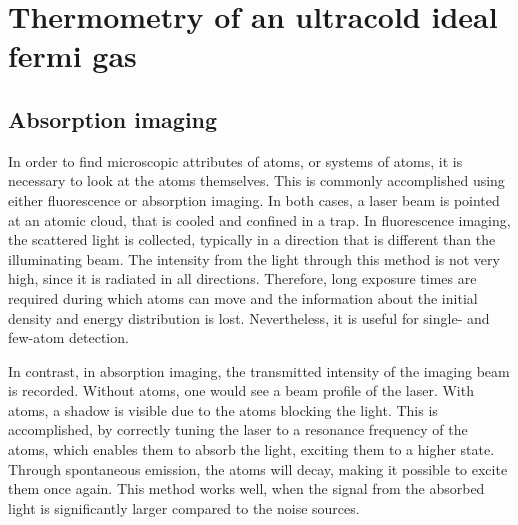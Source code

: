 \chapter{Thermometry of an ultracold ideal fermi gas}
\iffalse
The purpose of the camera is to measure scientifically important data from dense atomic clouds consisting of Lithium and Caesium.
The improvement of the resolution in the whole imaging setup now allows to find new attributes that could not be measured before and as an example, fermionic superfluids were chosen. The key signature of a superfluid transition can be found by creating a population imbalance, that then shows a unique structure in the centre of the cloud, differing them from the Thomas-Fermi distribution that is apparent in Bose-Einstein condensates (BEC).
\fi

\section{Absorption imaging}
In order to find microscopic attributes of atoms, or systems of atoms, it is necessary to look at the atoms themselves. This is commonly accomplished using either fluorescence or absorption imaging. In both cases, a laser beam is pointed at an atomic cloud, that is cooled and confined in a trap. In fluorescence imaging, the scattered light is collected, typically in a direction that is different than the illuminating beam.
The intensity from the light through this method is not very high, since it is radiated in all directions. Therefore, long exposure times are required during which atoms can move and the information about the initial density and energy distribution is lost. Nevertheless, it is useful for single- and few-atom detection. 

In contrast, in absorption imaging, the transmitted intensity of the imaging beam is recorded. Without atoms, one would see a beam profile of the laser. With atoms, a shadow is visible due to the atoms blocking the light. This is accomplished, by correctly tuning the laser to a resonance frequency of the atoms, which enables them to absorb the light, exciting them to a higher state. Through spontaneous emission, the atoms will decay, making it possible to excite them once again. This method works well, when the signal from the absorbed light is significantly larger compared to the noise sources. 

